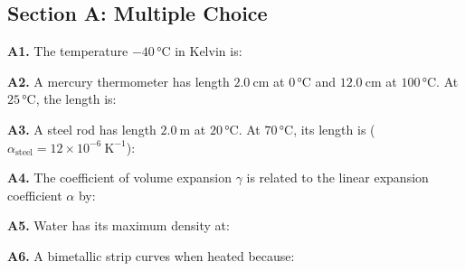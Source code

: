\newpage
\begin{exercisebox}[13]

\subsection*{Section A: Multiple Choice}

\textbf{A1.} The temperature $-40\,°\text{C}$ in
Kelvin is:


\vspace{0.4cm}

\textbf{A2.} A mercury thermometer has length
$2.0\ \text{cm}$ at $0\,°\text{C}$ and
$12.0\ \text{cm}$ at $100\,°\text{C}$. At
$25\,°\text{C}$, the length is:


\vspace{0.4cm}

\textbf{A3.} A steel rod has length $2.0\ \text{m}$
at $20\,°\text{C}$. At $70\,°\text{C}$, its length is
($\alpha_{\text{steel}} = 12\times10^{-6}\ \text{K}^{-1}$):


\vspace{0.4cm}

\textbf{A4.} The coefficient of volume expansion
$\gamma$ is related to the linear expansion
coefficient $\alpha$ by:


\vspace{0.4cm}

\textbf{A5.} Water has its maximum density at:


\vspace{0.4cm}

\textbf{A6.} A bimetallic strip curves when heated
because:


\end{exercisebox}
